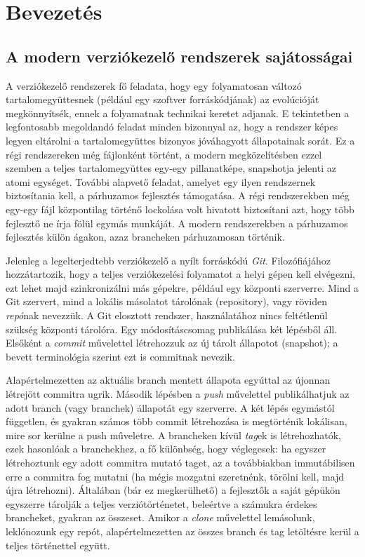 \documentclass[
]{elteikthesis}[2025/03/25]
\begin{document}
\tableofcontents
\cleardoublepage

\chapter{Bevezetés}

\section{A modern verziókezelő rendszerek sajátosságai}

A verziókezelő rendszerek fő feladata,
hogy egy folyamatosan változó tartalomegyüttesnek (például egy szoftver forráskódjának)
az evolúcióját megkönnyítsék, ennek a folyamatnak technikai keretet adjanak.
E tekintetben a legfontosabb megoldandó feladat minden bizonnyal az,
hogy a rendszer képes legyen eltárolni a tartalomegyüttes bizonyos jóváhagyott állapotainak sorát.
Ez a régi rendszereken még fájlonként történt,
a modern megközelítésben ezzel szemben a teljes tartalomegyüttes
egy-egy pillanatképe, snapshotja jelenti az atomi egységet.
További alapvető feladat, amelyet egy ilyen rendszernek biztosítania kell, a párhuzamos fejlesztés támogatása.
A régi rendszerekben még egy-egy fájl központilag történő lockolása volt hivatott biztosítani azt,
hogy több fejlesztő ne írja fölül egymás munkáját.
A modern rendszerekben a párhuzamos fejlesztés külön ágakon, azaz brancheken párhuzamosan történik.

Jelenleg a legelterjedtebb verziókezelő a nyílt forráskódú \textit{Git}.
Filozófiájához hozzátartozik,
hogy a teljes verziókezelési folyamatot a helyi gépen kell elvégezni,
ezt lehet majd szinkronizálni más gépekre, például egy központi szerverre.
Mind a Git szervert, mind a lokális másolatot tárolónak (repository),
vagy röviden \textit{repó}nak nevezzük.
A Git elosztott rendszer,
használatához nincs feltétlenül szükség központi tárolóra.
Egy módosításcsomag publikálása két lépésből áll.
Elsőként a \textit{commit} művelettel létrehozzuk az új tárolt állapotot (snapshot);
a bevett terminológia szerint ezt is commitnak nevezik.


Alapértelmezetten az aktuális branch mentett állapota egyúttal az újonnan létrejött commitra ugrik.
Második lépésben a \textit{push} művelettel publikálhatjuk az adott branch (vagy branchek) állapotát egy szerverre.
A két lépés egymástól független,
és gyakran számos több commit létrehozása is megtörténik lokálisan,
mire sor kerülne a push műveletre.
A brancheken kívül \textit{tag}ek is létrehozhatók,
ezek hasonlóak a branchekhez,
a fő különbség, hogy véglegesek:
ha egyszer létrehoztunk egy adott commitra mutató taget,
az a továbbiakban immutábilisen erre a commitra fog mutatni
(ha mégis mozgatni szeretnénk, törölni kell, majd újra létrehozni).
Általában (bár ez megkerülhető) a fejlesztők a saját gépükön
egyszerre tárolják a teljes verziótörténetet,
beleértve a számukra érdekes brancheket, gyakran az összeset.
Amikor a \textit{clone} művelettel lemásolunk, leklónozunk egy repót,
alapértelmezetten az összes branch és tag letöltésre kerül a teljes történettel együtt.
\end{document}
